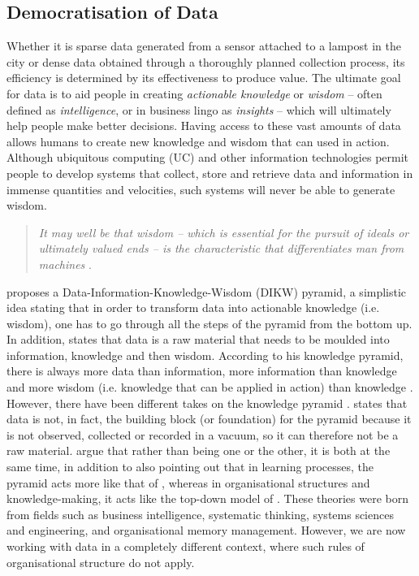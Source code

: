 \begin{introduction}
\subsection{Democratisation of Data}
Whether it is sparse data generated from a sensor attached to a lampost in the city or dense data obtained through a thoroughly planned collection process, its efficiency is determined by its effectiveness to produce value. The ultimate goal for data is to aid people in creating \textit{actionable knowledge} or \textit{wisdom} -- often defined as \textit{intelligence}, or in business lingo as \textit{insights} -- which will ultimately help people make better decisions.
Having access to these vast amounts of data allows humans to create new knowledge and wisdom that can used in action. Although ubiquitous computing (UC) and other information technologies permit people to develop systems that collect, store and retrieve data and information in immense quantities and velocities, such systems will never be able to generate wisdom.
\begin{quote}
    \textit{It may well be that wisdom -- which is essential for the pursuit of ideals or ultimately valued ends -- is the characteristic that differentiates man from machines} \citep{ackoff_data_1999}.
\end{quote}
\citet{ackoff_data_1989} proposes a Data-Information-Knowledge-Wisdom (DIKW) pyramid, a simplistic idea stating that in order to transform data into actionable knowledge (i.e. wisdom), one has to go through all the steps of the pyramid from the bottom up. In addition, \cite{ackoff_data_1989} states that data is a raw material \citep[cf.]{tuomi_data_1999,gitelman_raw_2013} that needs to be moulded into information, knowledge and then wisdom. According to his knowledge pyramid, there is always more data than information, more information than knowledge and more wisdom (i.e. knowledge that can be applied in action) than knowledge \citep[cf.]{jennex_revised_2013}. However, there have been different takes on the knowledge pyramid \citep{tuomi_data_1999,jennex_revised_2013}. \cite{tuomi_data_1999} states that data is not, in fact, the building block (or foundation) for the pyramid because it is not observed, collected or recorded in a vacuum, so it can therefore not be a raw material. \cite{jennex_revised_2013} argue that rather than being one or the other, it is both at the same time, in addition to also pointing out that in learning processes, the pyramid acts more like that of \cite{ackoff_data_1989}, whereas in organisational structures and knowledge-making, it acts like the top-down model of \cite{tuomi_data_1999}. These theories were born from fields such as business intelligence, systematic thinking, systems sciences and engineering, and organisational memory management. However, we are now working with data in a completely different context, where such rules of organisational structure do not apply.


\end{introduction}
